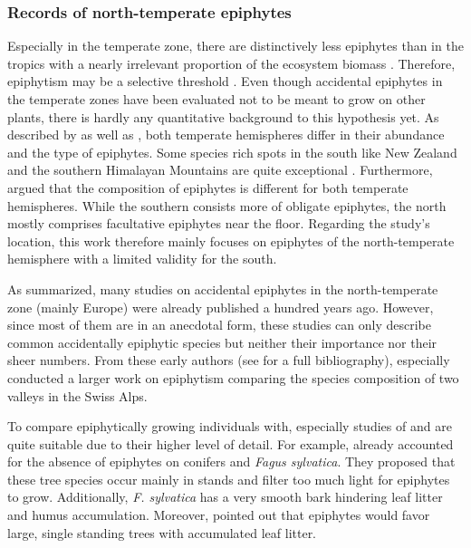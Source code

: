 \documentclass[12pt, a4paper, oneside, draft]{scrartcl}
\begin{document}
	
	\subsubsection*{Records of north-temperate epiphytes}
	Especially in the temperate zone, there are distinctively less epiphytes than in the tropics with a nearly irrelevant proportion of the ecosystem biomass \cim. Therefore, epiphytism may be a selective threshold . Even though accidental epiphytes in the temperate zones have been evaluated not to be meant to grow on other plants, there is hardly any quantitative background to this hypothesis yet.
	\label{key}	
	As described by \textcite{Schimper1888} as well as \textcite{Gentry1987a}, both temperate hemispheres differ in their abundance and the type of epiphytes. Some species rich spots in the south like New Zealand and the southern Himalayan Mountains are quite exceptional \parencite[see ZotzBibliography]{Schimper1888, Hofstede2001}. Furthermore, \textcite{Burns2010} argued that the composition of epiphytes is different for both temperate hemispheres. While the southern consists more of obligate epiphytes, the north mostly comprises facultative epiphytes near the floor. Regarding the study's location, this work therefore mainly focuses on epiphytes of the north-temperate hemisphere with a limited validity for the south.
	
	
	As \textcite{Zotz2003} summarized, many studies on accidental epiphytes in the north-temperate zone (mainly Europe) were already published a hundred years ago. However, since most of them are in an anecdotal form, these studies can only describe common accidentally epiphytic species but neither their importance nor their sheer numbers. From these early authors \parencite[e.g.][]{Beyle1903, Beyer1896, Staeger1912,Magnin1895,Loew1892} (see \parencite{Zotz2003a} for a full bibliography), especially \textcite{Staeger1908} conducted a larger work on epiphytism comparing the species composition of two valleys in the Swiss Alps.
	
	To compare epiphytically growing individuals with, especially studies of \textcite{Staeger1908} and \textcite{Loew1892} are quite suitable due to their higher level of detail. For example, \textcite[p. 34]{Staeger1908} already accounted for the absence of epiphytes on conifers and \textit{Fagus sylvatica}. They proposed that these tree species occur mainly in  stands and filter too much light for epiphytes to grow. Additionally, \textit{F. sylvatica} has a very smooth bark hindering leaf litter and humus accumulation. Moreover, \textcite{Staeger1908} pointed out that epiphytes would favor large, single standing trees with accumulated leaf litter.
	
\end{document}
